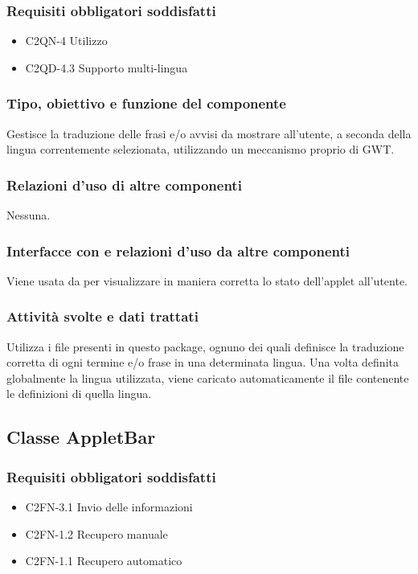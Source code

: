 \subsubsection*{Requisiti obbligatori soddisfatti}
\begin{itemize}
	\item C2QN-4 Utilizzo
	\item C2QD-4.3 Supporto multi-lingua
\end{itemize}
\subsubsection*{Tipo, obiettivo e funzione del componente}
Gestisce la traduzione delle frasi e/o avvisi da mostrare all'utente, a seconda
della lingua correntemente selezionata, utilizzando un meccanismo proprio di
GWT.

\subsubsection*{Relazioni d'uso di altre componenti}
Nessuna.

\subsubsection*{Interfacce con e relazioni d'uso da altre componenti}
Viene usata da  per visualizzare in maniera corretta lo stato
dell'applet all'utente.

\subsubsection*{Attivit\`a svolte e dati trattati}
Utilizza i file  presenti in questo package, ognuno dei quali
definisce la traduzione corretta di ogni termine e/o frase in una determinata
lingua.
Una volta definita globalmente la lingua utilizzata, viene caricato
automaticamente il file contenente le definizioni di quella lingua.

\subsection{Classe AppletBar}
\subsubsection*{Requisiti obbligatori soddisfatti}
\begin{itemize}
	\item C2FN-3.1 Invio delle informazioni
	\item C2FN-1.2 Recupero manuale
	\item C2FN-1.1 Recupero automatico
\end{itemize}
